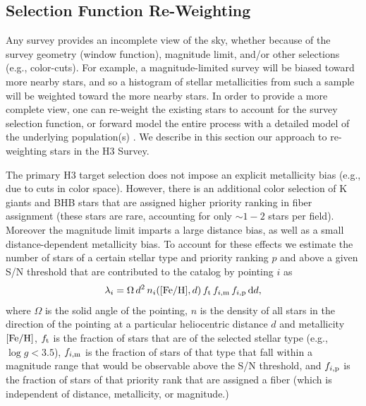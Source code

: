 \documentclass[twocolumn,tighten,twocolappendix]{aastex63}
\begin{document}
\begin{CJK*}{UTF8}{gbsn}
\subsection{Selection Function Re-Weighting}
\label{sec:reweighting}

Any survey provides an incomplete view of the sky, whether because of the survey geometry (window function), magnitude limit, and/or other selections (e.g., color-cuts).  For example, a magnitude-limited survey will be biased toward more nearby stars, and so a histogram of stellar metallicities from such a sample will be weighted toward the more nearby stars.  In order to provide a more complete view, one can re-weight the existing stars to account for the survey selection function, or forward model the entire process with a detailed model of the underlying population(s) \citep[see e.g.,][]{Rix13}.  We describe in this section our approach to re-weighting stars in the H3 Survey.

The primary H3 target selection does not impose an explicit metallicity bias (e.g., due to cuts in color space).  However, there is an additional color selection of K giants and BHB stars \citep{Conroy19a} that are assigned higher priority ranking in fiber assignment (these stars are rare, accounting for only $\sim 1-2$ stars per field).  Moreover the magnitude limit imparts a large distance bias, as well as a small distance-dependent metallicity bias.  To account for these effects we estimate the number of stars of a certain stellar type and priority ranking $p$ and above a given S/N threshold that are contributed to the catalog by pointing $i$ as
\begin{equation}
\lambda_i  = \Omega \, d^2  \, n_i({\rm [Fe/H]}, d) \, f_{\rm t} \, f_{i, {\rm m}} \, f_{i, {\rm p}} \, {\rm d} d,
\end{equation}
\noindent
where $\Omega$ is the solid angle of the pointing, $n$ is the density of all stars in the direction of the pointing at a particular heliocentric distance $d$ and metallicity ${\rm [Fe/H]}$, $f_{\rm t}$ is the fraction of stars that are of the selected stellar type (e.g., $\log g < 3.5$), $f_{i, {\rm m}}$ is the fraction of stars of that type that fall within a magnitude range that would be observable above the S/N threshold, and $f_{i, {\rm p}}$ is the fraction of stars of that priority rank that are assigned a fiber (which is independent of distance, metallicity, or magnitude.)


\end{CJK*}
\end{document}
